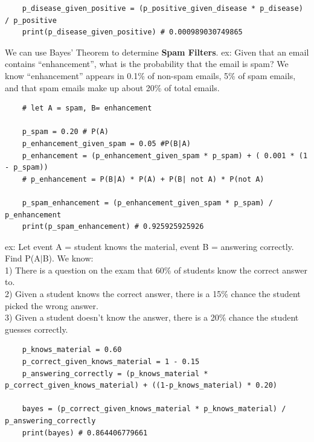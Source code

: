 \documentclass[11pt, a4paper]{article}
\begin{document}
\begin{spacing}{1.1}
\begin{lstlisting}
	p_disease_given_positive = (p_positive_given_disease * p_disease) / p_positive
	print(p_disease_given_positive) # 0.000989030749865	\end{lstlisting} \vspace*{1mm}
	We can use Bayes' Theorem to determine \textbf{Spam Filters}. ex: Given that an email contains “enhancement”, what is the probability that the email is spam? We know “enhancement” appears in 0.1\% of non-spam emails, 5\% of spam emails, and that spam emails make up about 20\% of total emails.
	\begin{lstlisting}
	# let A = spam, B= enhancement
	
	p_spam = 0.20 # P(A)
	p_enhancement_given_spam = 0.05 #P(B|A)
	p_enhancement = (p_enhancement_given_spam * p_spam) + ( 0.001 * (1 - p_spam))
	# p_enhancement = P(B|A) * P(A) + P(B| not A) * P(not A) 
	
	p_spam_enhancement = (p_enhancement_given_spam * p_spam) / p_enhancement
	print(p_spam_enhancement) # 0.925925925926	\end{lstlisting} \vspace*{1mm}
	ex: Let event A = student knows the material, event B = answering correctly. Find P(A$|$B). We know: \\
	1) There is a question on the exam that 60\% of students know the correct answer to. \\
	2) Given a student knows the correct answer, there is a 15\% chance the student picked the wrong answer.\\
	3) Given a student doesn't know the answer, there is a 20\% chance the student guesses correctly.	
	\begin{lstlisting}
	p_knows_material = 0.60
	p_correct_given_knows_material = 1 - 0.15
	p_answering_correctly = (p_knows_material * p_correct_given_knows_material) + ((1-p_knows_material) * 0.20)
	
	bayes = (p_correct_given_knows_material * p_knows_material) / p_answering_correctly
	print(bayes) # 0.864406779661	\end{lstlisting} \newpage


\end{spacing}
\end{document}
